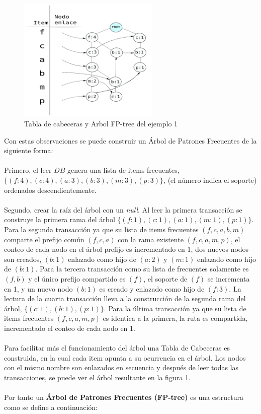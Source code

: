 \begin{figure}[ht]
   \centering
   \includegraphics[width=0.6\textwidth]{images/fptree1.png}
   \caption{Tabla de cabeceras y Arbol FP-tree del ejemplo 1}
   \label{fptid}
\end{figure}

\newpage

Con estas observaciones se puede construir un \'Arbol de Patrones Frecuentes de la siguiente forma:\\ \\
Primero, el leer $DB$ genera una lista de items frecuentes, $\{(f:4),(c:4),(a:3),(b:3),(m:3),(p:3)\}$, (el
n\'umero indica el soporte) ordenados descendientemente.\\ \\
Segundo, crear la ra\'iz del \'arbol con un \textit{null}. Al leer la primera 
transacci\'on se construye la primera rama del \'arbol $\{(f:1),(c:1),(a:1),(m:1),(p:1)\}$. Para la segunda 
transacci\'on ya que su lista de items frecuentes $(f,c,a,b,m)$ comparte el prefijo com\'un $(f,c,a)$ con la rama
existente $(f,c,a,m,p)$, el conteo de cada nodo en el \'arbol prefijo es incrementado en 1, dos nuevos nodos son
creados, $(b:1)$ enlazado como hijo de $(a:2)$ y $(m:1)$ enlazado como hijo de $(b:1)$. Para la tercera 
transacci\'on como su lista de frecuentes solamente es $(f,b)$ y el \'unico prefijo compartido es $(f)$, el
soporte de $(f)$ se incrementa en 1, y un nuevo nodo $(b:1)$ es creado y enlazado como hijo de $(f:3)$. La
lectura de la cuarta transacci\'on lleva a la construcci\'on de la segunda rama del \'arbol,
$\{(c:1),(b:1),(p:1)\}$. Para la \'ultima transacci\'on ya que su lista de items frecuentes $(f,c,a,m,p)$ es
identica a la primera, la ruta es compartida, incrementado el conteo de cada nodo en 1.\\ \\
Para facilitar m\'as el funcionamiento del \'arbol una Tabla de Cabeceras es construida, en la cual cada item
apunta a su ocurrencia en el \'arbol. Los nodos con el mismo nombre son enlazados en secuencia y despu\'es de
leer todas las transacciones, se puede ver el \'arbol resultante en la figura \ref{fptid}.\\ \\
Por tanto un \textbf{\'Arbol de Patrones Frecuentes (FP-tree)} es una estructura como se define a
continuaci\'on:\\

